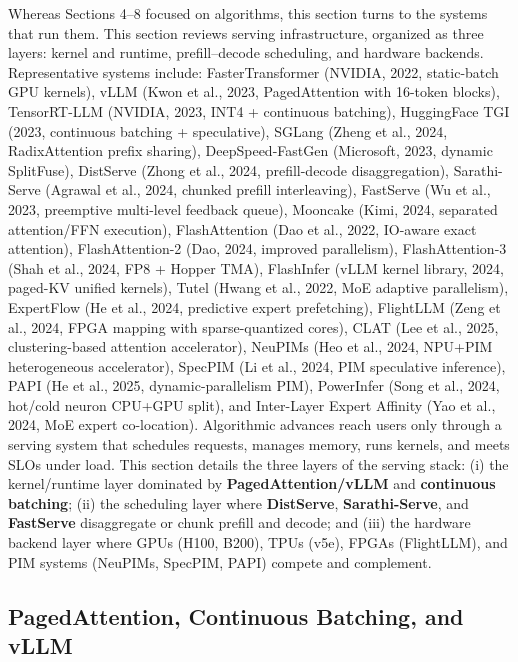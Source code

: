 \documentclass{article}
\begin{document}
Whereas Sections 4--8 focused on algorithms, this section turns to the systems that run them. This section reviews serving infrastructure, organized as three layers: kernel and runtime, prefill--decode scheduling, and hardware backends. Representative systems include: FasterTransformer (NVIDIA, 2022, static-batch GPU kernels), vLLM (Kwon et al., 2023, PagedAttention with 16-token blocks), TensorRT-LLM (NVIDIA, 2023, INT4 + continuous batching), HuggingFace TGI (2023, continuous batching + speculative), SGLang (Zheng et al., 2024, RadixAttention prefix sharing), DeepSpeed-FastGen (Microsoft, 2023, dynamic SplitFuse), DistServe (Zhong et al., 2024, prefill-decode disaggregation), Sarathi-Serve (Agrawal et al., 2024, chunked prefill interleaving), FastServe (Wu et al., 2023, preemptive multi-level feedback queue), Mooncake (Kimi, 2024, separated attention/FFN execution), FlashAttention (Dao et al., 2022, IO-aware exact attention), FlashAttention-2 (Dao, 2024, improved parallelism), FlashAttention-3 (Shah et al., 2024, FP8 + Hopper TMA), FlashInfer (vLLM kernel library, 2024, paged-KV unified kernels), Tutel (Hwang et al., 2022, MoE adaptive parallelism), ExpertFlow (He et al., 2024, predictive expert prefetching), FlightLLM (Zeng et al., 2024, FPGA mapping with sparse-quantized cores), CLAT (Lee et al., 2025, clustering-based attention accelerator), NeuPIMs (Heo et al., 2024, NPU+PIM heterogeneous accelerator), SpecPIM (Li et al., 2024, PIM speculative inference), PAPI (He et al., 2025, dynamic-parallelism PIM), PowerInfer (Song et al., 2024, hot/cold neuron CPU+GPU split), and Inter-Layer Expert Affinity (Yao et al., 2024, MoE expert co-location). Algorithmic advances reach users only through a serving system that schedules requests, manages memory, runs kernels, and meets SLOs under load. This section details the three layers of the serving stack: (i) the kernel/runtime layer dominated by \textbf{PagedAttention/vLLM} and \textbf{continuous batching}; (ii) the scheduling layer where \textbf{DistServe}, \textbf{Sarathi-Serve}, and \textbf{FastServe} disaggregate or chunk prefill and decode; and (iii) the hardware backend layer where GPUs (H100, B200), TPUs (v5e), FPGAs (FlightLLM), and PIM systems (NeuPIMs, SpecPIM, PAPI) compete and complement.

\subsection{PagedAttention, Continuous Batching, and vLLM}\label{pagedattention-continuous-batching-and-vllm}
\end{document}
